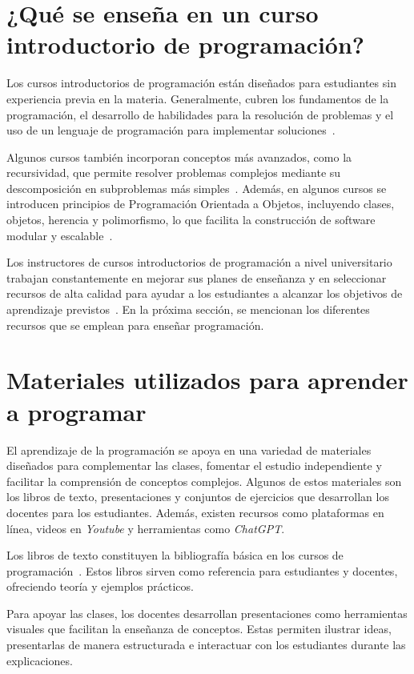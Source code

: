 \section{¿Qué se enseña en un curso introductorio de programación?}\label{sec:contents}

Los cursos introductorios de programación están diseñados para estudiantes sin experiencia previa en la materia. Generalmente, cubren los fundamentos de la programación, el desarrollo de habilidades para la resolución de problemas y el uso de un lenguaje de programación para implementar soluciones~\cite{Medeiros2019}.

Algunos cursos también incorporan conceptos más avanzados, como la recursividad, que permite resolver problemas complejos mediante su descomposición en subproblemas más simples~\cite{cs50_harvard,mit_60001}. Además, en algunos cursos se introducen principios de Programación Orientada a Objetos, incluyendo clases, objetos, herencia y polimorfismo, lo que facilita la construcción de software modular y escalable~\cite{cs50_harvard, mit_60001}.

Los instructores de cursos introductorios de programación a nivel universitario trabajan constantemente en mejorar sus planes de enseñanza y en seleccionar recursos de alta calidad para ayudar a los estudiantes a alcanzar los objetivos de aprendizaje previstos~\cite{wong2022}. En la próxima sección, se mencionan los diferentes recursos que se emplean para enseñar programación.

\section{Materiales utilizados para aprender a programar}\label{sec:resources}

El aprendizaje de la programación se apoya en una variedad de materiales diseñados para complementar las clases, fomentar el estudio independiente y facilitar la comprensión de conceptos complejos. Algunos de estos materiales son los libros de texto, presentaciones y conjuntos de ejercicios que desarrollan los docentes para los estudiantes. Además, existen recursos como plataformas en línea, videos en \textit{Youtube} y herramientas como \textit{ChatGPT}.

Los libros de texto constituyen la bibliografía básica en los cursos de programación~\cite{wong2022}. Estos libros sirven como referencia para estudiantes y docentes, ofreciendo teoría y ejemplos prácticos.

Para apoyar las clases, los docentes desarrollan presentaciones como herramientas visuales que facilitan la enseñanza de conceptos. Estas permiten ilustrar ideas, presentarlas de manera estructurada e interactuar con los estudiantes durante las explicaciones.

